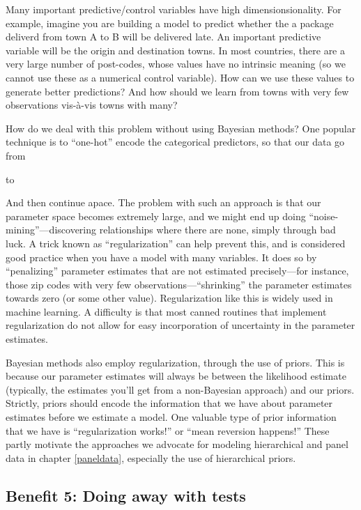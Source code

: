 \documentclass[]{book}
\begin{document}
Many important predictive/control variables have high
dimensionsionality. For example, imagine you are building a model to
predict whether the a package deliverd from town A to B will be
delivered late. An important predictive variable will be the origin and
destination towns. In most countries, there are a very large number of
post-codes, whose values have no intrinsic meaning (so we cannot use
these as a numerical control variable). How can we use these values to
generate better predictions? And how should we learn from towns with
very few observations vis-à-vis towns with many?

How do we deal with this problem without using Bayesian methods? One
popular technique is to ``one-hot'' encode the categorical predictors,
so that our data go from

to

And then continue apace. The problem with such an approach is that our
parameter space becomes extremely large, and we might end up doing
``noise-mining''---discovering relationships where there are none,
simply through bad luck. A trick known as ``regularization'' can help
prevent this, and is considered good practice when you have a model with
many variables. It does so by ``penalizing'' parameter estimates that
are not estimated precisely---for instance, those zip codes with very
few observations---``shrinking'' the parameter estimates towards zero
(or some other value). Regularization like this is widely used in
machine learning. A difficulty is that most canned routines that
implement regularization do not allow for easy incorporation of
uncertainty in the parameter estimates.

Bayesian methods also employ regularization, through the use of priors.
This is because our parameter estimates will always be between the
likelihood estimate (typically, the estimates you'll get from a
non-Bayesian approach) and our priors. Strictly, priors should encode
the information that we have about parameter estimates before we
estimate a model. One valuable type of prior information that we have is
``regularization works!'' or ``mean reversion happens!'' These partly
motivate the approaches we advocate for modeling hierarchical and panel
data in chapter \ref{paneldata}, especially the use of hierarchical
priors.

\subsection*{Benefit 5: Doing away with
tests}\label{benefit-5-doing-away-with-tests}
\end{document}
